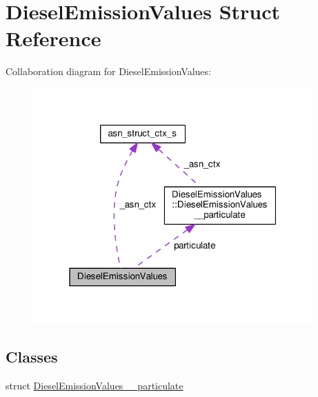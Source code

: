 \hypertarget{structDieselEmissionValues}{}\section{Diesel\+Emission\+Values Struct Reference}
\label{structDieselEmissionValues}


Collaboration diagram for Diesel\+Emission\+Values\+:\nopagebreak
\begin{figure}[H]
\begin{center}
\leavevmode
\includegraphics[width=304pt]{structDieselEmissionValues__coll__graph}
\end{center}
\end{figure}
\subsection*{Classes}
\begin{DoxyCompactItemize}
\item 
struct \hyperlink{structDieselEmissionValues_1_1DieselEmissionValues____particulate}{Diesel\+Emission\+Values\+\_\+\+\_\+particulate}
\end{DoxyCompactItemize}
